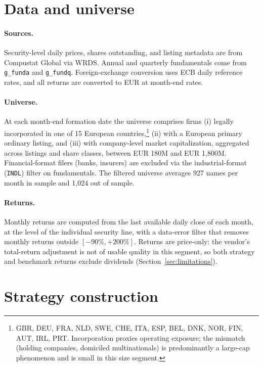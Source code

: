 \documentclass[11pt,a4paper]{article}
\begin{document}
\section{Data and universe}
\label{sec:data}

\paragraph{Sources.} Security-level daily prices, shares outstanding, and
listing metadata are from Compustat Global via WRDS. Annual and quarterly
fundamentals come from \texttt{g\_funda} and \texttt{g\_fundq}.
Foreign-exchange conversion uses ECB daily reference rates, and all returns
are converted to EUR at month-end rates.

\paragraph{Universe.} At each month-end formation date the universe comprises
firms (i) legally incorporated in one of 15 European countries,\footnote{GBR,
DEU, FRA, NLD, SWE, CHE, ITA, ESP, BEL, DNK, NOR, FIN, AUT, IRL, PRT.
Incorporation proxies operating exposure; the mismatch (holding companies,
domiciled multinationals) is predominantly a large-cap phenomenon and is
small in this size segment.} (ii) with a European primary ordinary listing, and
(iii) with company-level market capitalization, aggregated across listings
and share classes, between EUR 180M and EUR 1{,}800M. Financial-format
filers (banks, insurers) are excluded via the industrial-format
(\texttt{INDL}) filter on fundamentals. The filtered universe averages 927
names per month in sample and 1{,}024 out of sample.

\paragraph{Returns.} Monthly returns are computed from the last available
daily close of each month, at the level of the individual security line,
with a data-error filter that removes
monthly returns outside $[-90\%, +200\%]$. Returns are price-only: the vendor's
total-return adjustment is not of usable quality in this segment, so both
strategy and benchmark returns exclude dividends
(Section~\ref{sec:limitations}).

\section{Strategy construction}
\label{sec:factors}
\end{document}
